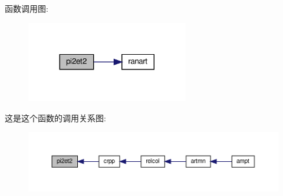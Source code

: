 函数调用图\+:
\nopagebreak
\begin{figure}[H]
\begin{center}
\leavevmode
\includegraphics[width=200pt]{pi2et2_8f90_ae934a0c9b5d6ad52a5ed544c432ece9e_cgraph}
\end{center}
\end{figure}
这是这个函数的调用关系图\+:
\nopagebreak
\begin{figure}[H]
\begin{center}
\leavevmode
\includegraphics[width=350pt]{pi2et2_8f90_ae934a0c9b5d6ad52a5ed544c432ece9e_icgraph}
\end{center}
\end{figure}
